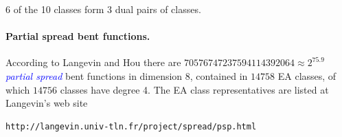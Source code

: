 \documentclass[12pt,a4paper]{article}
\newcommand{\Emph}[1]{\emph{\textcolor{blue}{#1}}}
\begin{document}
6 of the 10 classes form 3 dual pairs of classes.

\paragraph*{Partial spread bent functions.}

According to Langevin and Hou \cite{LanH11counting}
there are $70576747237594114392064 \approx 2^{75.9}$ \Emph{partial spread} bent functions in
dimension 8,
contained in $14758$ EA classes, of which $14756$ classes have degree 4.
%
%
The EA class representatives are listed at Langevin's web site
%
\begin{verbatim}
http://langevin.univ-tln.fr/project/spread/psp.html
\end{verbatim}

\end{document}
